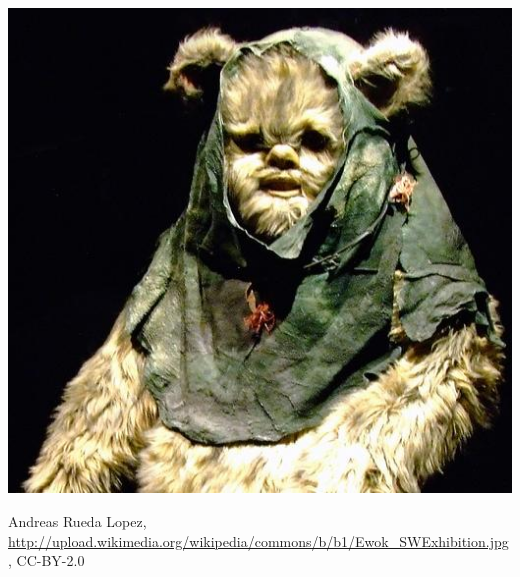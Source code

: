 \begin{minipage}[t]{100mm}
\begin{center}
\includegraphics[width=\linewidth]{Ewok.jpg}

\tiny Andreas Rueda Lopez, \url{http://upload.wikimedia.org/wikipedia/commons/b/b1/Ewok_SWExhibition.jpg}, CC-BY-2.0
\end{center}

\end{minipage}
